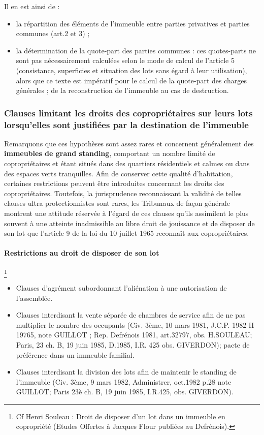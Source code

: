 			Il en est ainsi de :
			\begin{itemize}
				\item la répartition des éléments de l'immeuble entre parties privatives et parties communes (art.2 et 3) ;
				\item la détermination de la quote-part des parties communes : ces quotes-parts ne sont pas nécessairement calculées selon le mode de calcul de l'article 5 (consistance, superficies et situation des lots sans égard à leur utilisation), alors que ce texte est impératif pour le calcul de la quote-part des charges générales ; de la reconstruction de l'immeuble au cas de destruction.
			\end{itemize}
		
		\subsubsection{Clauses limitant les droits des copropriétaires sur leurs lots lorsqu'elles sont justifiées par la destination de l'immeuble}
		
			Remarquons que ces hypothèses sont assez rares et concernent généralement des \textbf{immeubles de grand standing}, comportant un nombre limité de copropriétaires et étant situés dans des quartiers résidentiels et calmes ou dans des espaces verts tranquilles. Afin de conserver cette qualité d'habitation, certaines restrictions peuvent être introduites concernant les droits des copropriétaires. Toutefois, la jurisprudence reconnaissant la validité de telles clauses ultra protectionnistes sont rares, les Tribunaux de façon générale montrent une attitude réservée à l'égard de ces clauses qu'ils assimilent le plus souvent à une atteinte inadmissible au libre droit de jouissance et de disposer de son lot que l'article 9 de la loi du 10 juillet 1965 reconnaît aux copropriétaires.
	
			\paragraph{Restrictions au droit de disposer de son lot}\footnote{Cf Henri Souleau : Droit de disposer d'un lot dans un immeuble en copropriété (Etudes Offertes à Jacques Flour publiées au Defrénois).}
			\begin{itemize}
				\item Clauses d'agrément subordonnant l'aliénation à une autorisation de l'assemblée.
				\item Clauses interdisant la vente séparée de chambres de service afin de ne pas multiplier le nombre des occupants (Civ. 3ème, 10 mars 1981, J.C.P. 1982 II 19765, note GUILLOT ; Rep. Defrénois 1981, art.32797, obs. H.SOULEAU; Paris, 23 ch. B, 19 juin 1985, D.1985, I.R. 425 obs. GIVERDON); pacte de préférence dans un immeuble familial.
				\item Clauses interdisant la division des lots afin de maintenir le standing de l'immeuble (Civ. 3ème, 9 mars 1982, Administrer, oct.1982 p.28 note GUILLOT; Paris 23è ch. B, 19 juin 1985, I.R.425, obs. GIVERDON).
			\end{itemize}
			
